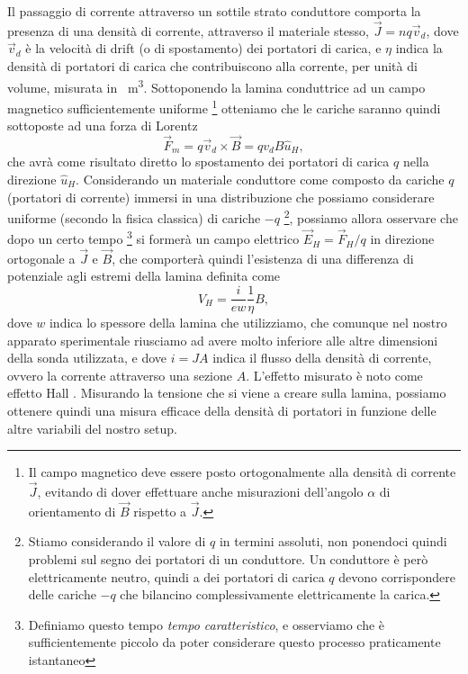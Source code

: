 \documentclass[
    prl,
    reprint, 
    superscriptaddress, 
    altaffilletter, 
    amsmath, 
    amssymb, 
    a4paper,
    varvw]{revtex4-2}
\begin{document}
Il passaggio di corrente attraverso un sottile strato conduttore comporta la presenza di una densità di corrente, attraverso il materiale stesso, $\vec{J}=nq\vec{v}_d$, dove $\vec{v}_d$ è la velocità di drift (o di spostamento) dei portatori di carica, e $\eta$ indica la densità di portatori di carica che contribuiscono alla corrente, per unità di volume, misurata in \si{\per\cubic\metre}. Sottoponendo la lamina conduttrice ad un campo magnetico sufficientemente uniforme \footnote{Il campo magnetico deve essere posto ortogonalmente alla densità di corrente $\vec{J}$, evitando di dover effettuare anche misurazioni dell'angolo $\alpha$ di orientamento di $\vec{B}$ rispetto a $\vec{J}$.} otteniamo che le cariche saranno quindi sottoposte ad una forza di Lorentz \begin{equation}
    \vec{F}_m = q\vec{v}_d \times \vec{B} = qv_dB\hat{u}_H,\label{eq:lorentz_F_m}
\end{equation} che avrà come risultato diretto lo spostamento dei portatori di carica $q$ nella direzione $\hat{u}_H$. Considerando un materiale conduttore come composto da cariche $q$ (portatori di corrente) immersi in una distribuzione che possiamo considerare uniforme (secondo la fisica classica) di cariche $-q$ \footnote{Stiamo considerando il valore di $q$ in termini assoluti, non ponendoci quindi problemi sul segno dei portatori di un conduttore. Un conduttore è però elettricamente neutro, quindi a dei portatori di carica $q$ devono corrispondere delle cariche $-q$ che bilancino complessivamente elettricamente la carica. }, possiamo allora osservare che dopo un certo tempo \footnote{Definiamo questo tempo \emph{tempo caratteristico}, e osserviamo che è sufficientemente piccolo da poter considerare questo processo praticamente istantaneo} si formerà un campo elettrico $\vec{E}_H = \vec{F}_H/q$ in direzione ortogonale a $\vec{J}$ e $\vec{B}$, che comporterà quindi l'esistenza di una differenza di potenziale agli estremi della lamina definita come \begin{equation}
    V_H = \frac{i}{ew}\frac{1}{\eta}B,
\end{equation} dove $w$ indica lo spessore della lamina che utilizziamo, che comunque nel nostro apparato sperimentale riusciamo ad avere molto inferiore alle altre dimensioni della sonda utilizzata, e dove $i=JA$ indica il flusso della densità di corrente, ovvero la corrente attraverso una sezione $A$. L'effetto misurato è noto come effetto Hall \cite{Hall_1897}. Misurando la tensione che si viene a creare sulla lamina, possiamo ottenere quindi una misura efficace della densità di portatori in funzione delle altre variabili del nostro setup. 
\end{document}
